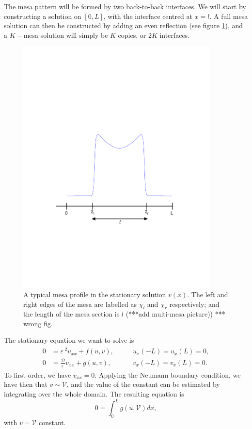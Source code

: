 \documentclass[a4paper,10pt]{article}
\newcommand{\Ep}{\ensuremath{\varepsilon\,}}
\newcommand{\DD}{\ensuremath{\mathcal{D}}}
\newcommand{\VV}{\ensuremath{\mathcal{V}}}
\begin{document}
The mesa pattern will be formed by two back-to-back interfaces. We will start by constructing a solution on $[0,L]$, with the interface centred at $x=l$. A full mesa solution can then be constructed by adding an even reflection (see figure \ref{fig:single_mesa}), and a $K-$mesa solution will simply be $K$ copies, or $2K$ interfaces. 
% 
\begin{figure}[htb]
\begin{center}
\includegraphics[width=4in]{single_mesa}
\caption{A typical mesa profile in the stationary solution $v(x)$. The left and right edges of the mesa are labelled as $\chi_l$ and $\chi_r$ respectively; and the length of the mesa section is $l$ (***add multi-mesa picture)) *** wrong fig.}
\label{fig:single_mesa}
\end{center}
\end{figure}
% 
The stationary equation we want to solve is
% 
\begin{equation}
\label{eqn:gms_stat}
\begin{split}
\begin{aligned}
	0 &= \Ep^2 u_{xx}+ f(u,v),\qquad &u_x(-L)=u_x(L)=0, \\
	0 &= \frac{\DD}{\Ep}v_{xx}+ g(u,v),\qquad &v_x(-L)=v_x(L)=0.
\end{aligned}
\end{split}
\end{equation}
% 
To first order, we have $v_{xx}=0$. Applying the Neumann boundary condition, we have then that $v\sim\VV$, and the value of the constant can be estimated by integrating over the whole domain. The resulting equation is	
% 
\begin{equation}
\label{eqn:v_first_order}
  0 = \int_0^Lg(u,\VV)dx,
\end{equation}
% 
with $v=\VV$ constant.
\end{document}
